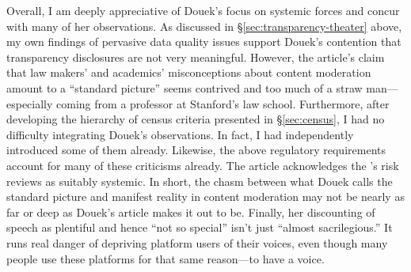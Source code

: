 Overall, I am deeply appreciative of Douek's focus on systemic forces and concur
with many of her observations. As discussed in \S\ref{sec:transparency-theater}
above, my own findings of pervasive data quality issues support Douek's
contention that transparency disclosures are not very meaningful. However, the
article's claim that law makers' and academics' misconceptions about content
moderation amount to a ``standard picture'' seems contrived and too much of a
straw man---especially coming from a professor at Stanford's law school.
Furthermore, after developing the hierarchy of census criteria presented in
\S\ref{sec:census}, I had no difficulty integrating Douek's observations. In
fact, I had independently introduced some of them already. Likewise, the above
regulatory requirements account for many of these criticisms already. The
article acknowledges the \DSA's risk reviews as suitably systemic. In short, the
chasm between what Douek calls the standard picture and manifest reality in
content moderation may not be nearly as far or deep as Douek's article makes it
out to be. Finally, her discounting of speech as plentiful and hence ``not so
special'' isn't just ``almost sacrilegious.'' It runs real danger of depriving
platform users of their voices, even though many people use these platforms for
that same reason---to have a voice.



